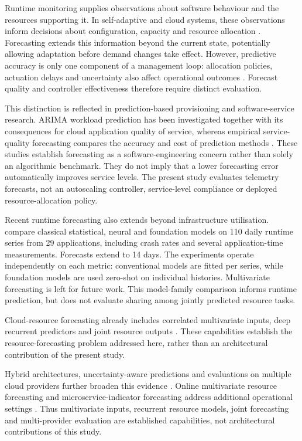 \documentclass[a4paper,fleqn]{cas-dc}
\begin{document}
Runtime monitoring supplies observations about software behaviour and the
resources supporting it. In self-adaptive and cloud systems, these observations
inform decisions about configuration, capacity and resource allocation
\citep{Taherizadeh2018Monitoring,Bauer2020SelfAware}. Forecasting extends this
information beyond the current state, potentially allowing adaptation before
demand changes take effect. However, predictive accuracy is only one component
of a management loop: allocation policies, actuation delays and uncertainty
also affect operational outcomes \citep{Qu2018Autoscaling}. Forecast quality
and controller effectiveness therefore require distinct evaluation.

This distinction is reflected in prediction-based provisioning and
software-service research. ARIMA workload prediction has been investigated
together with its consequences for cloud application quality of service,
whereas empirical service-quality forecasting compares the accuracy and cost
of prediction methods \citep{Calheiros2015ARIMA,Syu2017DynamicQoS}. These
studies establish forecasting as a software-engineering concern rather than
solely an algorithmic benchmark. They do not imply that a lower forecasting
error automatically improves service levels. The present study evaluates
telemetry forecasts, not an autoscaling controller, service-level compliance or
deployed resource-allocation policy.

Recent runtime forecasting also extends beyond infrastructure utilisation.
\citet{DiMenna2026RuntimeForecasting} compare classical statistical, neural
and foundation models on 110 daily runtime series from 29 applications,
including crash rates and several application-time measurements. Forecasts
extend to 14 days. The experiments operate independently on each metric:
conventional models are fitted per series, while foundation models are used
zero-shot on individual histories. Multivariate forecasting is left for future
work. This model-family comparison informs runtime prediction, but does not
evaluate sharing among jointly predicted resource tasks.

Cloud-resource forecasting already includes correlated multivariate inputs,
deep recurrent predictors and joint resource outputs
\citep{Tran2018MultivariateFuzzy,Xu2022esDNN,Ullah2023CloudBiLSTM}.
These capabilities establish the resource-forecasting problem addressed here,
rather than an architectural contribution of the present study.

Hybrid architectures, uncertainty-aware predictions and evaluations on multiple
cloud providers further broaden this evidence
\citep{Tripathi2025MMRP,Rossi2025CloudUncertainty,Zhang2025SWTCLSTM}.
Online multivariate resource forecasting and microservice-indicator forecasting
address additional operational settings \citep{Gao2026OMCR,Gao2026MaMiClif}.
Thus multivariate inputs, recurrent resource models, joint forecasting and
multi-provider evaluation are established capabilities, not architectural
contributions of this study.
\end{document}
